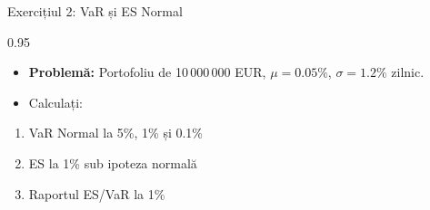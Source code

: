 \documentclass[9pt, aspectratio=169, t]{beamer}
\begin{document}
\begin{frame}{Exercițiul 2: VaR și ES Normal}
\begin{cminipage}{0.95\textwidth}
    \begin{itemize}\setlength{\itemsep}{0pt}
        \item \textbf{Problemă:} Portofoliu de 10\,000\,000 EUR, $\mu = 0.05\%$, $\sigma = 1.2\%$ zilnic.
        \item Calculați:
    \end{itemize}
    \begin{enumerate}\setlength{\itemsep}{0pt}
        \item VaR Normal la 5\%, 1\% și 0.1\%
        \item ES la 1\% sub ipoteza normală
        \item Raportul ES/VaR la 1\%
    \end{enumerate}
\end{cminipage}
\end{frame}
\end{document}
